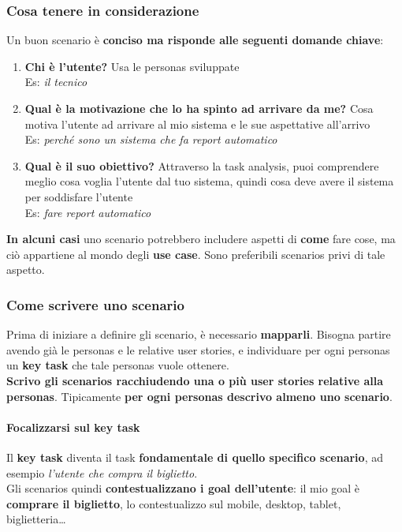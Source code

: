 \documentclass[10pt]{article}
\begin{document}
\subsubsection{Cosa tenere in considerazione}
Un buon scenario è \textbf{conciso ma risponde alle seguenti domande chiave}:
\begin{enumerate}
\item \textbf{Chi è l'utente?} Usa le personas sviluppate\\Es: \textit{il tecnico}
\item \textbf{Qual è la motivazione che lo ha spinto ad arrivare da me?} Cosa motiva l'utente ad arrivare al mio sistema e le sue aspettative all'arrivo\\Es: \textit{perché sono un sistema che fa report automatico}
\item \textbf{Qual è il suo obiettivo?} Attraverso la task analysis, puoi comprendere meglio cosa voglia l'utente dal tuo sistema, quindi cosa deve avere il sistema per soddisfare l'utente\\Es: \textit{fare report automatico}
\end{enumerate}
\textbf{In alcuni casi} uno scenario potrebbero includere aspetti di \textbf{come} fare cose, ma ciò appartiene al mondo degli \textbf{use case}. Sono preferibili scenarios privi di tale aspetto.
\pagebreak
\subsubsection{Come scrivere uno scenario}
Prima di iniziare a definire gli scenario, è necessario \textbf{mapparli}. Bisogna partire avendo già le personas e le relative user stories, e individuare per ogni personas un \textbf{key task} che tale personas vuole ottenere.\\
\textbf{Scrivo gli scenarios racchiudendo una o più user stories relative alla personas}. Tipicamente \textbf{per ogni personas descrivo almeno uno scenario}.
\paragraph{Focalizzarsi sul key task} Il \textbf{key task} diventa il task \textbf{fondamentale di quello specifico scenario}, ad esempio \textit{l'utente che compra il biglietto}.\\
Gli scenarios quindi \textbf{contestualizzano i goal dell'utente}: il mio goal è \textbf{comprare il biglietto}, lo contestualizzo sul mobile, desktop, tablet, biglietteria\ldots
\end{document}
